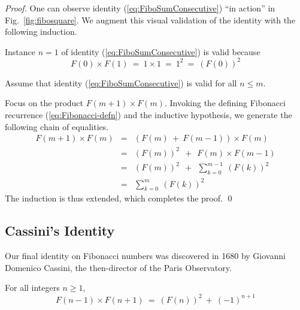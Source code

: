\begin{proof}
One can observe identity (\ref{eq:FiboSumConsecutive}) ``in action'' in Fig.~\ref{fig:fibosquare}.  We augment this visual validation of the identity with the following induction.

\medskip

Instance $n=1$ of identity (\ref{eq:FiboSumConsecutive}) is valid because
\[ F(0) \times F(1) \ = \ 1 \times 1 \ = \ 1^2 \ = \ (F(0))^2 \]

\medskip

Assume that identity (\ref{eq:FiboSumConsecutive}) is valid for all $n \leq m$.

\medskip

Focus on the product $F(m+1) \times F(m)$.  Invoking the defining Fibonacci recurrence
(\ref{eq:Fibonacci-defn}) and the inductive hypothesis, we generate the following chain of equalities.
\begin{eqnarray*}
F(m+1) \times F(m)
 & = &
   (F(m) \ + \ F(m-1)) \times F(m) \\
 & = &
   (F(m))^2 \ \ + \ \ F(m) \times F(m-1)  \\
 & = & 
   (F(m))^2  \ \ + \ \ \sum_{k=0}^{m-1} \ (F(k))^2  \\
 & = &
   \sum_{k=0}^{m} \ (F(k))^2
\end{eqnarray*}
The induction is thus extended, which completes the proof.  \qed
\end{proof}


\subsection{Cassini's Identity}
\label{sec:cassini}


Our final identity on Fibonacci numbers was discovered in 1680 by Giovanni Domenico Cassini, the then-director of the Paris Observatory.

\begin{prop} 
For all integers $n \geq 1$,
\begin{equation}
\label{eq:Cassini}
F(n-1) \times F(n+1) \ = \ (F(n))^2 \ + \ (-1)^{n+1}
\end{equation}
\end{prop}

